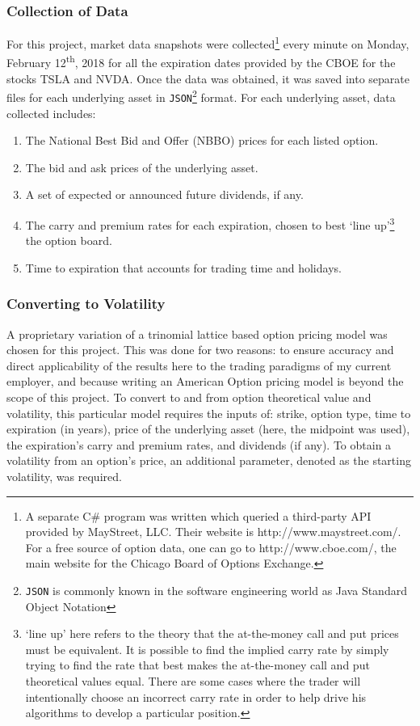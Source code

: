 \documentclass[12pt, a4paper, notitlepage]{article}
\def\code#1{\texttt{#1}}
\numberwithin{equation}{subsection}
\numberwithin{figure}{subsection}
\numberwithin{table}{subsection}
\newcommand{\newpar}{\newline \newline}
\begin{document}
\subsubsection{Collection of Data}\label{sec:CollectionOfData}
For this project, market data snapshots were collected\footnote{A separate C\# program was written which queried a third-party API provided by MayStreet, LLC.  Their website is http://www.maystreet.com/.  For a free source of option data, one can go to http://www.cboe.com/, the main website for the Chicago Board of Options Exchange.} every minute on Monday, February 12\textsuperscript{th}, 2018 for all the expiration dates provided by the CBOE for the stocks TSLA and NVDA.  Once the data was obtained, it was saved into separate files for each underlying asset in \code{JSON}\footnote{\code{JSON} is commonly known in the software engineering world as Java Standard Object Notation} format.
\newpar
For each underlying asset, data collected includes:
    \begin{enumerate}
    	\item	The National Best Bid and Offer (NBBO) prices for each listed option.
        \item	The bid and ask prices of the underlying asset.
        \item	A set of expected or announced future dividends, if any.
        \item	The carry and premium rates for each expiration, chosen to best `line up'\footnote{`line up' here refers to the theory that the at-the-money call and put prices must be equivalent.  It is possible to find the implied carry rate by simply trying to find the rate that best makes the at-the-money call and put theoretical values equal.  There are some cases where the trader will intentionally choose an incorrect carry rate in order to help drive his algorithms to develop a particular position.} the option board.
        \item	Time to expiration that accounts for trading time and holidays.
    \end{enumerate}

\subsubsection{Converting to Volatility}\label{sec:ConvertingToVol}
A proprietary variation of a trinomial lattice based option pricing model was chosen for this project.  This was done for two reasons: to ensure accuracy and direct applicability of the results here to the trading paradigms of my current employer, and because writing an American Option pricing model is beyond the scope of this project.  To convert to and from option theoretical value and volatility, this particular model requires the inputs of: strike, option type, time to expiration (in years), price of the underlying asset (here, the midpoint was used), the expiration's carry and premium rates, and dividends (if any).  To obtain a volatility from an option's price, an additional parameter, denoted as the starting volatility, was required.
\end{document}
